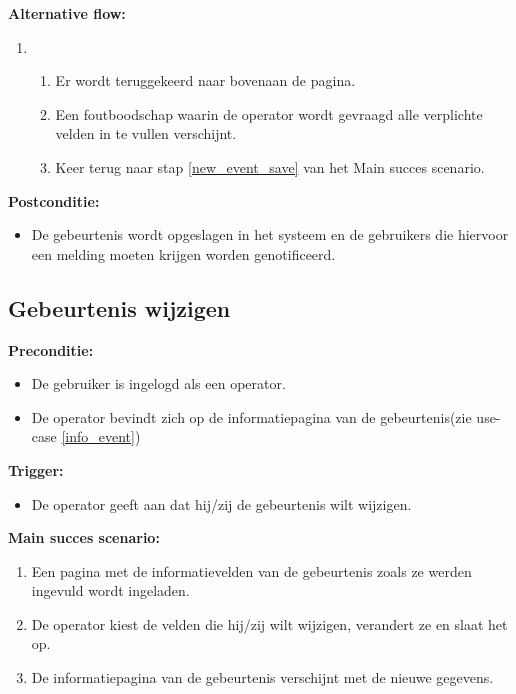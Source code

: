 \documentclass[11pt,twoside,a4paper]{article}
\newcommand{\subpunt}[1]{
	\noindent
	\textbf{\small{#1}}
}
\newenvironment{precond}{
	\subpunt{Preconditie:}
	\begin{itemize}[label={}]
}{
	\end{itemize}
}
\newenvironment{trigger}{
	\subpunt{Trigger:}
	\begin{itemize}[label={}]
}{
	\end{itemize}
}
\newenvironment{mainss}{
	\subpunt{Main succes scenario:}
	\begin{enumerate}
}{
	\end{enumerate}
}
\newenvironment{altern}{
	\subpunt{Alternative flow:}
	\begin{enumerate}
}{
	\end{enumerate}
}
\newenvironment{postcond}{
	\subpunt{Postconditie:}
	\begin{itemize}[label={}]
}{
	\end{itemize}
}
\newcommand{\flowidx}{0}
\newcounter{nstap}
\newcommand{\flowtitle}[1]{					%
	\setcounter{nstap}{0}
	\item[\flowidx.][\emph{#1}]
}
\newcommand{\flowstap}{ 					%
	\stepcounter{nstap}
	\item[\flowidx.\arabic{nstap}]
}
\newenvironment{flow}[2]{					
	\renewcommand{\flowidx}{#1}
	
	\flowtitle{#2}
	\begin{enumerate}
}{
	\end{enumerate}
}
\begin{document}
	\begin{altern}
		\begin{flow}{\ref{new_event_end}}{Niet alle verplichte velden zijn ingevuld.}
			\flowstap Er wordt teruggekeerd naar bovenaan de pagina.
			\flowstap Een foutboodschap waarin de operator wordt gevraagd alle verplichte velden in te vullen verschijnt.
			\flowstap Keer terug naar stap \ref{new_event_save} van het Main succes scenario.
		\end{flow}
	\end{altern}
	
	\begin{postcond}
	\item De gebeurtenis wordt opgeslagen in het systeem en de gebruikers die hiervoor een melding moeten krijgen worden genotificeerd.
	\end{postcond}


	\subsection{Gebeurtenis wijzigen}
	
	\begin{precond}
	\item De gebruiker is ingelogd als een operator.
	\item De operator bevindt zich op de informatiepagina van de gebeurtenis(zie use-case \ref{info_event})
	\end{precond}
	
	\begin{trigger}
	\item De operator geeft aan dat hij/zij de gebeurtenis wilt wijzigen.
	\end{trigger}
	
	\begin{mainss}
		\item Een pagina met de informatievelden van de gebeurtenis zoals ze werden ingevuld wordt ingeladen.
		\item De operator kiest de velden die hij/zij wilt wijzigen, verandert ze en slaat het op.\label{chg_event_save}
		\item De informatiepagina van de gebeurtenis verschijnt met de nieuwe gegevens.\label{chg_event_end}
	\end{mainss}
	
\end{document}
